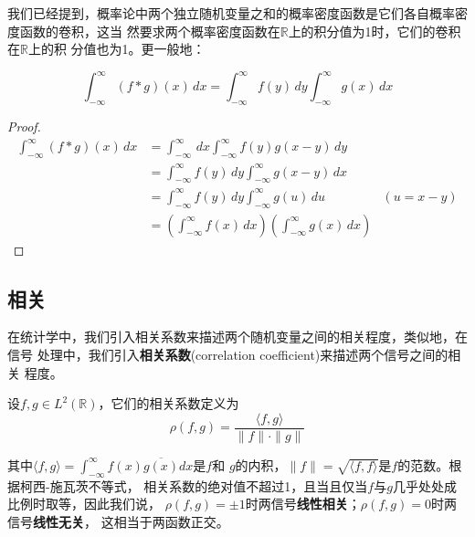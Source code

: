 我们已经提到，概率论中两个独立随机变量之和的概率密度函数是它们各自概率密度函数的卷积，这当
然要求两个概率密度函数在$\mathbb{R}$上的积分值为1时，它们的卷积在$\mathbb{R}$上的积
分值也为1。更一般地：
\begin{proposition}[卷积的“面积”关系]
\[\int_{-\infty}^{\infty}(f*g)(x)\,dx=\int_{-\infty}^{\infty}f(y)\,dy\int_{-\infty}^{\infty}g(x)\,dx\]
\end{proposition}
\begin{proof}
\begin{align*}
    \int_{-\infty}^{\infty}(f*g)(x)\,dx & =\int_{-\infty}^{\infty}\,dx\int_{-\infty}^{\infty}f(y)g(x-y)\,dy                                   \\
                                        & =\int_{-\infty}^{\infty}f(y)\,dy\int_{-\infty}^{\infty}g(x-y)\,dx                                   \\
                                        & =\int_{-\infty}^{\infty}f(y)\,dy\int_{-\infty}^{\infty}g(u)\,du                           & (u=x-y) \\
                                        & =\left(\int_{-\infty}^{\infty}f(x)\,dx\right)\left(\int_{-\infty}^{\infty}g(x)\,dx\right)
\end{align*}
\end{proof}

\subsection{相关}\label{sub:correlation}
在统计学中，我们引入相关系数来描述两个随机变量之间的相关程度，类似地，在信号
处理中，我们引入\textbf{相关系数}(correlation coefficient)来描述两个信号之间的相关
程度。
\begin{definition}[相关系数]
设$f,g\in L^2(\mathbb{R})$，它们的相关系数定义为
\begin{equation*}
    \rho(f,g)=\frac{\langle f,g\rangle}{\|f\|\cdot\|g\|}
\end{equation*}
\end{definition}
其中$\langle f,g\rangle=\int_{-\infty}^{\infty}f(x)\overline{g(x)}dx$是$f$和
$g$的内积，$\|f\|=\sqrt{\langle f,f\rangle}$是$f$的范数。根据柯西-施瓦茨不等式，
相关系数的绝对值不超过1，且当且仅当$f$与$g$几乎处处成比例时取等，因此我们说，
$\rho(f,g)=\pm 1$时两信号\textbf{线性相关}；$\rho(f,g)=0$时两信号\textbf{线性无关}，
这相当于两函数正交。

